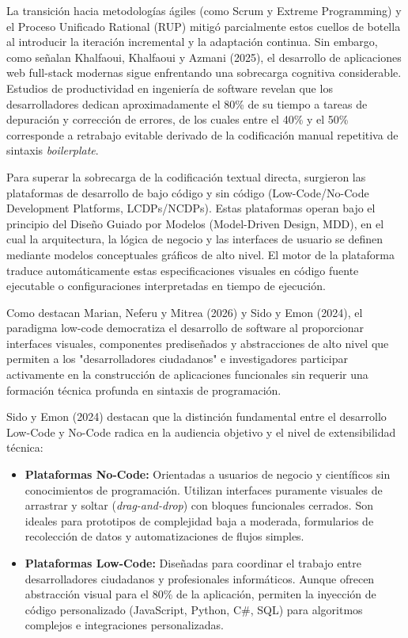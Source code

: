 La transición hacia metodologías ágiles (como Scrum y Extreme Programming) y el Proceso Unificado Rational (RUP) mitigó parcialmente estos cuellos de botella al introducir la iteración incremental y la adaptación continua. Sin embargo, como señalan Khalfaoui, Khalfaoui y Azmani (2025), el desarrollo de aplicaciones web full-stack modernas sigue enfrentando una sobrecarga cognitiva considerable. Estudios de productividad en ingeniería de software revelan que los desarrolladores dedican aproximadamente el 80\% de su tiempo a tareas de depuración y corrección de errores, de los cuales entre el 40\% y el 50\% corresponde a retrabajo evitable derivado de la codificación manual repetitiva de sintaxis \textit{boilerplate}.

Para superar la sobrecarga de la codificación textual directa, surgieron las plataformas de desarrollo de bajo código y sin código (Low-Code/No-Code Development Platforms, LCDPs/NCDPs). Estas plataformas operan bajo el principio del Diseño Guiado por Modelos (Model-Driven Design, MDD), en el cual la arquitectura, la lógica de negocio y las interfaces de usuario se definen mediante modelos conceptuales gráficos de alto nivel. El motor de la plataforma traduce automáticamente estas especificaciones visuales en código fuente ejecutable o configuraciones interpretadas en tiempo de ejecución.

Como destacan Marian, Neferu y Mitrea (2026) y Sido y Emon (2024), el paradigma low-code democratiza el desarrollo de software al proporcionar interfaces visuales, componentes prediseñados y abstracciones de alto nivel que permiten a los "desarrolladores ciudadanos" e investigadores participar activamente en la construcción de aplicaciones funcionales sin requerir una formación técnica profunda en sintaxis de programación.

Sido y Emon (2024) destacan que la distinción fundamental entre el desarrollo Low-Code y No-Code radica en la audiencia objetivo y el nivel de extensibilidad técnica:

\begin{itemize}
    \item \textbf{Plataformas No-Code:} Orientadas a usuarios de negocio y científicos sin conocimientos de programación. Utilizan interfaces puramente visuales de arrastrar y soltar (\textit{drag-and-drop}) con bloques funcionales cerrados. Son ideales para prototipos de complejidad baja a moderada, formularios de recolección de datos y automatizaciones de flujos simples.
    \item \textbf{Plataformas Low-Code:} Diseñadas para coordinar el trabajo entre desarrolladores ciudadanos y profesionales informáticos. Aunque ofrecen abstracción visual para el 80\% de la aplicación, permiten la inyección de código personalizado (JavaScript, Python, C\#, SQL) para algoritmos complejos e integraciones personalizadas.
\end{itemize}

